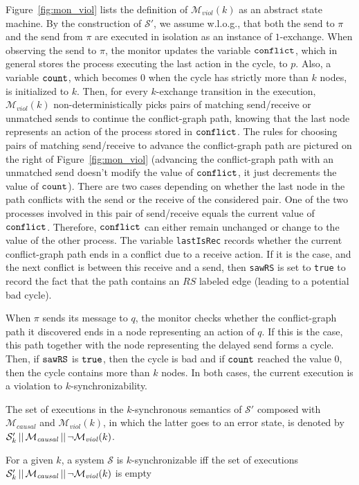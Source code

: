 Figure~\ref{fig:mon_viol} lists the definition of $\mathcal{M}_{\mathit{viol}}(k)$ as an abstract state machine. 
By the construction of $\mathcal{S'}$, we assume w.l.o.g., that both the send to $\pi$ and the send from $\pi$ are executed in isolation as an instance of $1$-exchange.
When observing the send to $\pi$, the monitor updates the variable ${\tt conflict}$, which in general stores the process executing the last action in the cycle, to $p$. Also, a variable ${\tt count}$, which becomes $0$ when the cycle has strictly more than $k$ nodes, is initialized to $k$. 
Then, for every $k$-exchange transition in the execution, $\mathcal{M}_{\mathit{viol}}(k)$ non-deterministically picks pairs of matching send/receive or unmatched sends to continue the conflict-graph path, knowing that the last node represents an action of the process stored in ${\tt conflict}$. The rules for choosing pairs of matching send/receive to advance the conflict-graph path are pictured on the right of Figure~\ref{fig:mon_viol} (advancing the conflict-graph path with an unmatched send doesn't modify the value of ${\tt conflict}$, it just decrements the value of ${\tt count}$). There are two cases depending on whether the last node in the path conflicts with the send or the receive of the considered pair. One of the two processes involved in this pair of send/receive equals the current value of ${\tt conflict}$. Therefore, ${\tt conflict}$ can either remain unchanged or change to the value of the other process. The variable {\tt lastIsRec} records whether the current conflict-graph path ends in a conflict due to a receive action. If it is the case, and the next conflict is between this receive and a send, then {\tt sawRS} is set to {\tt true} to record the fact that the path contains an $RS$ labeled edge (leading to a potential bad cycle).

When $\pi$ sends its message to $q$, the monitor checks whether the conflict-graph path it discovered ends in a node representing an action of $q$. If this is the case, this path together with the node representing the delayed send forms a cycle. Then, if ${\tt sawRS}$ is ${\tt true}$, then the cycle is bad and if ${\tt count}$ reached the value $0$, then the cycle contains more than $k$ nodes. In both cases, the current execution is a violation to $k$-synchronizability.

The set of executions in the $k$-synchronous semantics of $\mathcal{S}'$ composed with $\mathcal{M}_{\mathit{causal}}$ and $\mathcal{M}_{\mathit{viol}}(k)$, in which the latter goes to an error state, is denoted by $\mathcal{S}_k' \,||\,\mathcal{M}_{\mathit{causal}}\,||\, \neg \mathcal{M}_{\mathit{viol}}(k)$.

\begin{theorem}\label{th:main-verif}
For a given $k$, a system $\mathcal{S}$ is $k$-synchronizable iff the set of executions
$
\mathcal{S}_k' \,||\,\mathcal{M}_{\mathit{causal}}\,||\, \neg \mathcal{M}_{\mathit{viol}}(k)
$
is empty
\end{theorem}








